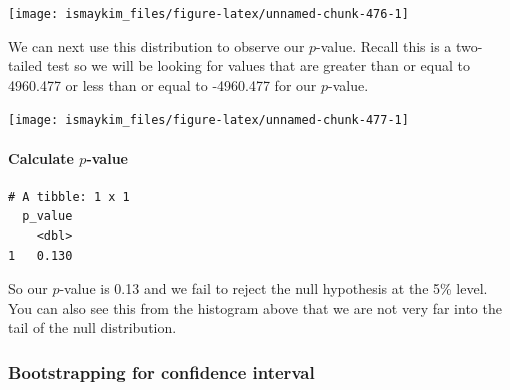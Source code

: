 \documentclass[12pt, krantz2,]{krantz}
\makeatletter
\newenvironment{Shaded}{\begin{snugshade}}{\end{snugshade}}
\newcommand{\DataTypeTok}[1]{\textcolor[rgb]{0.27,0.27,0.27}{#1}}
\newcommand{\KeywordTok}[1]{\textcolor[rgb]{0.27,0.27,0.27}{\textbf{#1}}}
\newcommand{\NormalTok}[1]{#1}
\newcommand{\OperatorTok}[1]{\textcolor[rgb]{0.43,0.43,0.43}{\textbf{#1}}}
\newcommand{\StringTok}[1]{\textcolor[rgb]{0.5,0.5,0.5}{#1}}
\let\oldparagraph\paragraph
\renewcommand{\paragraph}[1]{\oldparagraph{#1}\mbox{}}
\newenvironment{kframe}{%
\medskip{}
\setlength{\fboxsep}{.8em}
 \def\at@end@of@kframe{}%
 \ifinner\ifhmode%
  \def\at@end@of@kframe{\end{minipage}}%
  \begin{minipage}{\columnwidth}%
 \fi\fi%
 \def\FrameCommand##1{\hskip\@totalleftmargin \hskip-\fboxsep
 \colorbox{shadecolor}{##1}\hskip-\fboxsep
     \hskip-\linewidth \hskip-\@totalleftmargin \hskip\columnwidth}%
 \MakeFramed {\advance\hsize-\width
   \@totalleftmargin\z@ \linewidth\hsize
   \@setminipage}}%
 {\par\unskip\endMakeFramed%
 \at@end@of@kframe}
\renewenvironment{Shaded}{\begin{kframe}}{\end{kframe}}
\makeatother
\begin{document}
\begin{center}\texttt{[image: ismaykim\_files/figure-latex/unnamed-chunk-476-1]} \end{center}

We can next use this distribution to observe our \(p\)-value. Recall this is a two-tailed test so we will be looking for values that are greater than or equal to 4960.477 or less than or equal to -4960.477 for our \(p\)-value.

\begin{Shaded}
\end{Shaded}

\begin{center}\texttt{[image: ismaykim\_files/figure-latex/unnamed-chunk-477-1]} \end{center}

\hypertarget{calculate-p-value-3}{%
\paragraph{\texorpdfstring{Calculate \(p\)-value}{Calculate p-value}}\label{calculate-p-value-3}}

\begin{Shaded}
\end{Shaded}

\begin{verbatim}
# A tibble: 1 x 1
  p_value
    <dbl>
1   0.130
\end{verbatim}

So our \(p\)-value is 0.13 and we fail to reject the null hypothesis at the 5\% level. You can also see this from the histogram above that we are not very far into the tail of the null distribution.

\hypertarget{bootstrapping-for-confidence-interval-3}{%
\subsubsection*{Bootstrapping for confidence interval}\label{bootstrapping-for-confidence-interval-3}}
\end{document}
